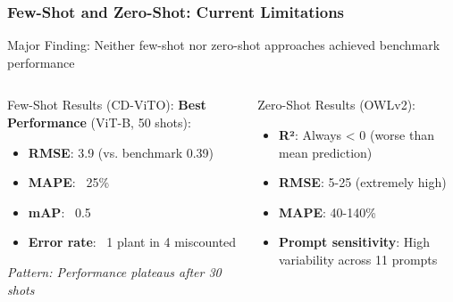 \documentclass[aspectratio=43]{beamer}
\begin{document}
\begin{frame}
    \frametitle{Few-Shot and Zero-Shot: Current Limitations}
    
    \begin{alertblock}{Major Finding:}
        \large Neither few-shot nor zero-shot approaches achieved benchmark performance
    \end{alertblock}
    
    \begin{columns}
        \begin{column}{0.5\textwidth}
            \begin{block}{Few-Shot Results (CD-ViTO):}
                \small
                \textbf{Best Performance} (ViT-B, 50 shots):
                \begin{itemize}
                    \item \textbf{RMSE}: 3.9 (vs. benchmark 0.39)
                    \item \textbf{MAPE}: ~25\%
                    \item \textbf{mAP}: ~0.5
                    \item \textbf{Error rate}: ~1 plant in 4 miscounted
                \end{itemize}
                
                \textit{Pattern: Performance plateaus after 30 shots}
            \end{block}
        \end{column}
        
        \begin{column}{0.5\textwidth}
            \begin{block}{Zero-Shot Results (OWLv2):}
                \small
                \begin{itemize}
                    \item \textbf{R²}: Always < 0 (worse than mean prediction)
                    \item \textbf{RMSE}: 5-25 (extremely high)
                    \item \textbf{MAPE}: 40-140\%
                    \item \textbf{Prompt sensitivity}: High variability across 11 prompts
                \end{itemize}
            \end{block}
        \end{column}
    \end{columns}
    

\end{frame}
\end{document}
